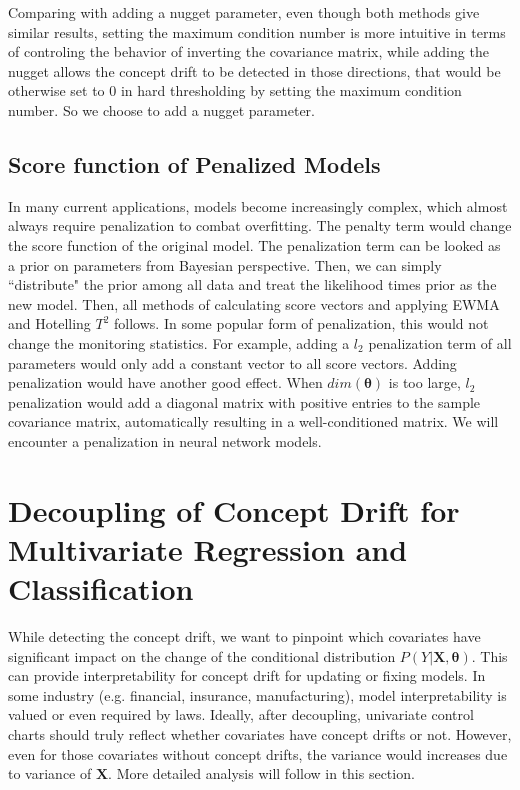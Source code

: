 \documentclass[twoside,11pt]{article}
\begin{document}
Comparing with adding a nugget parameter, even though both methods give similar results, setting the maximum condition number is more intuitive in terms of controling the behavior of inverting the covariance matrix, while adding the nugget allows the concept drift to be detected in those directions, that would be otherwise set to $0$ in hard thresholding by setting the maximum condition number. So we choose to add a nugget parameter.

\subsection{Score function of Penalized Models}
In many current applications, models become increasingly complex, which almost always require penalization to combat overfitting. The penalty term would change the score function of the original model. The penalization term can be looked as a prior on parameters from Bayesian perspective. Then, we can simply ``distribute" the prior among all data and treat the likelihood times prior as the new model. Then, all methods of calculating score vectors and applying EWMA and Hotelling $T^2$ follows. In some popular form of penalization, this would not change the monitoring statistics. For example, adding a $l_2$ penalization term of all parameters would only add a constant vector to all score vectors. Adding penalization would have another good effect. When $dim ( \bm { \theta})$ is too large, $l_2$ penalization would add a diagonal matrix with positive entries to the sample covariance matrix, automatically resulting in a well-conditioned matrix. We will encounter a penalization in neural network models. 

\section{Decoupling of Concept Drift for Multivariate Regression and Classification}
\label{s:decou_cd}
While detecting the concept drift, we want to pinpoint which {covariates} have significant impact on the change of {the} conditional distribution {$P(Y| \bm {X}, \bm{\theta})$}. This can provide interpretability for concept drift for updating or fixing models. In some industry (e.g. financial, insurance, manufacturing), model interpretability is valued or even required by laws. Ideally, after decoupling, univariate control charts should truly reflect whether covariates have concept drifts or not. However, even for those covariates without concept drifts, the variance would increases due to variance of $\bm {X}$. More detailed analysis will follow in this section.
\end{document}

